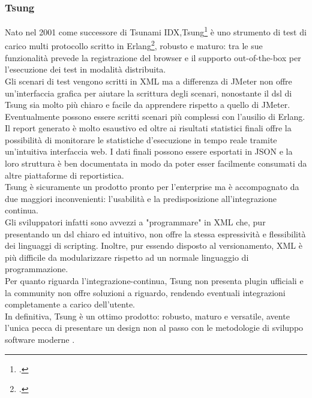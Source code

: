 \subsubsection{Tsung}
Nato nel 2001 come successore di Tsunami IDX,Tsung\footcite{site:tsung} è uno strumento di test di carico multi protocollo scritto in Erlang\footcite{site:erlang}, robusto e maturo: tra le sue funzionalità prevede la registrazione del browser e il supporto \gls{out-of-the-box} per l'esecuzione dei test in modalità distribuita.\\
Gli scenari di test vengono scritti in XML ma a differenza di JMeter non offre un'interfaccia grafica per aiutare la scrittura degli scenari, nonostante il \gls{dsl} di Tsung sia molto più chiaro e facile da apprendere rispetto a quello di JMeter. Eventualmente possono essere scritti scenari più complessi con l'ausilio di Erlang. \\
Il report generato è molto esaustivo ed oltre ai risultati statistici finali offre la possibilità di monitorare le statistiche d'esecuzione in tempo reale tramite un'intuitiva interfaccia web. I dati finali possono essere esportati in JSON e la loro struttura è ben documentata in modo da poter esser facilmente consumati da altre piattaforme di reportistica.\\
Tsung è sicuramente un prodotto pronto per l'enterprise ma è accompagnato da due maggiori inconvenienti: l'usabilità e la predisposizione all'integrazione continua. \\
Gli sviluppatori infatti sono avvezzi a "programmare" in XML che, pur presentando un \gls{dsl} chiaro ed intuitivo, non offre la stessa espressività e flessibilità dei linguaggi di scripting. Inoltre, pur essendo disposto al versionamento, XML è più difficile da modularizzare rispetto ad un normale linguaggio di programmazione.\\
Per quanto riguarda l'\gls{integrazione-continua}, Tsung non presenta \gls{plugin} ufficiali e la community non offre soluzioni a riguardo, rendendo eventuali integrazioni completamente a carico dell'utente.\\
In definitiva, Tsung è un ottimo prodotto: robusto, maturo e versatile, avente l'unica pecca di presentare un design non al passo con le metodologie di sviluppo software moderne	. 
